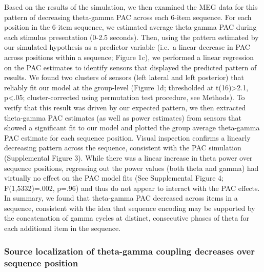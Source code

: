 Based on the results of the simulation, we then examined the MEG data
for this pattern of decreasing theta-gamma PAC across each 6-item
sequence. For each position in the 6-item sequence, we estimated average
theta-gamma PAC during each stimulus presentation (0-2.5 seconds). Then,
using the pattern estimated by our simulated hypothesis as a predictor
variable (i.e.~a linear decrease in PAC across positions within a
sequence; Figure 1c), we performed a linear regression on the PAC
estimates to identify sensors that displayed the predicted pattern of
results. We found two clusters of sensors (left lateral and left
posterior) that reliably fit our model at the group-level (Figure 1d;
thresholded at t(16)\textgreater{}2.1, p\textless{}.05;
cluster-corrected using permutation test procedure, see Methods). To
verify that this result was driven by our expected pattern, we then
extracted theta-gamma PAC estimates (as well as power estimates) from
sensors that showed a significant fit to our model and plotted the group
average theta-gamma PAC estimate for each sequence position. Visual
inspection confirms a linearly decreasing pattern across the sequence,
consistent with the PAC simulation (Supplemental Figure 3). While there
was a linear increase in theta power over sequence positions, regressing
out the power values (both theta and gamma) had virtually no effect on
the PAC model fits (See Supplemental Figure 4; F(1,5332)=.002, p=.96)
and thus do not appear to interact with the PAC effects. In summary, we
found that theta-gamma PAC decreased across items in a sequence,
consistent with the idea that sequence encoding may be supported by the
concatenation of gamma cycles at distinct, consecutive phases of theta
for each additional item in the sequence.

\subsubsection{Source localization of theta-gamma coupling decreases
over sequence
position}\label{source-localization-of-theta-gamma-coupling-decreases-over-sequence-position}

